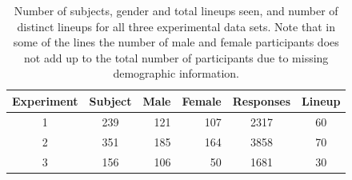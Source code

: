 \documentclass{article}
\newcommand{\hh}[1]{{\color{orange} #1}} %
\begin{document}

\begin{table}[hbtp]
\caption{Number of subjects, gender and total lineups seen, and number of distinct lineups for all three experimental data sets. Note that in some of the lines the number of male and female participants does not add up to the total number of participants due to missing demographic information. }
\begin{center}
\begin{tabular}{ccrrcc}
   \hline 
 Experiment & Subject & Male & Female & Responses &Lineup\\ 
    \hline
  1 & 239 & 121 & 107 & 2317 & 60 \\ 
  2 & 351 & 185 & 164 & 3858 & 70 \\ 
  3 & 156 & 106 &  50 & 1681 & 30 \\ 
   \hline
\end{tabular}
\end{center}
\label{tbl:summary}
\end{table}
\end{document}

